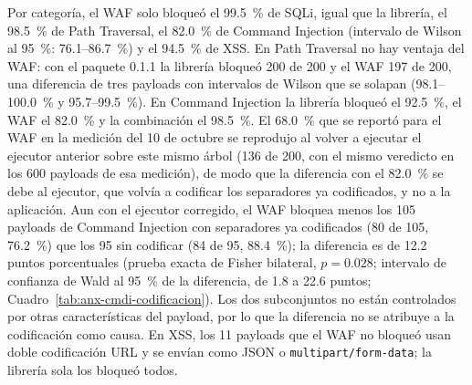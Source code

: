 Por categoría, el WAF solo bloqueó el 99.5~\% de SQLi, igual que la librería, el 98.5~\% de Path
Traversal, el 82.0~\% de Command Injection (intervalo de Wilson al 95~\%: 76.1--86.7~\%) y el
94.5~\% de XSS. En Path Traversal no hay ventaja del WAF: con el paquete 0.1.1 la librería bloqueó
200 de 200 y el WAF 197 de 200, una diferencia de tres payloads con intervalos de Wilson que se
solapan (98.1--100.0~\% y 95.7--99.5~\%). En Command Injection la librería bloqueó el 92.5~\%, el
WAF el 82.0~\% y la combinación el 98.5~\%. El 68.0~\% que se reportó para el WAF en la medición del
10 de octubre se reprodujo al volver a ejecutar el ejecutor anterior sobre este mismo árbol (136 de
200, con el mismo veredicto en los 600 payloads de esa medición), de modo que la diferencia con el
82.0~\% se debe al ejecutor, que volvía a codificar los separadores ya codificados, y no a la
aplicación. Aun con el ejecutor corregido, el WAF bloquea menos los 105 payloads de Command
Injection con separadores ya codificados (80 de 105, 76.2~\%) que los 95 sin codificar (84 de 95,
88.4~\%); la diferencia es de 12.2 puntos porcentuales (prueba exacta de Fisher bilateral,
$p = 0.028$; intervalo de confianza de Wald al 95~\% de la diferencia, de 1.8 a 22.6 puntos;
Cuadro~\ref{tab:anx-cmdi-codificacion}). Los dos subconjuntos no están controlados por otras
características del payload, por lo que la diferencia no se atribuye a la codificación como causa. En XSS, los 11 payloads que el WAF no bloqueó
usan doble codificación URL y se envían como JSON o \texttt{multipart/form-data}; la librería sola
los bloqueó todos.

